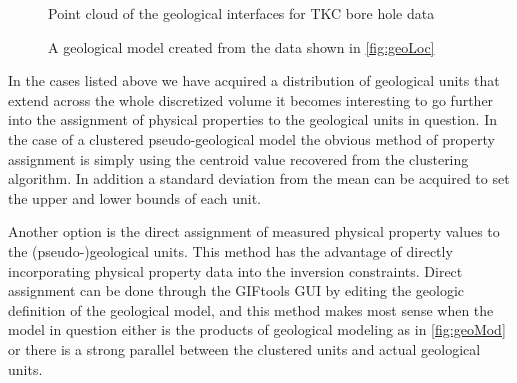 \begin{figure} [h]
    \centering
    \caption{Point cloud of the geological interfaces for TKC bore hole data}
    \label{fig:geoLoc}
\end{figure}

\begin{figure} [h]
    \centering
    \caption{A geological model created from the data shown in \autoref{fig:geoLoc}}
    \label{fig:geoMod}
\end{figure}

In the cases listed above we have acquired a distribution of geological units that extend across the whole discretized volume it becomes interesting to go further into the assignment of physical properties to the geological units in question. In the case of a clustered pseudo-geological model the obvious method of property assignment is simply using the centroid value recovered from the clustering algorithm. In addition a standard deviation from the mean can be acquired to set the upper and lower bounds of each unit.

Another option is the direct assignment of measured physical property values to the (pseudo-)geological units. This method has the advantage of directly incorporating physical property data into the inversion constraints. Direct assignment can be done through the GIFtools \ac{GUI} by editing the geologic definition of the geological model, and this method makes most sense when the model in question either is the products of geological modeling as in \autoref{fig:geoMod} or there is a strong parallel between the clustered units and actual geological units. 

